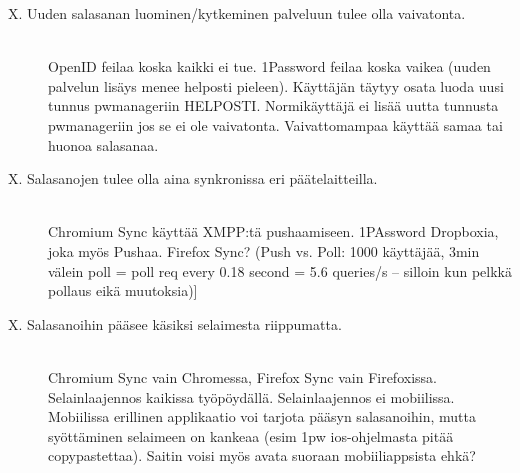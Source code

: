 \documentclass[english,gradu]{tktltiki}
\begin{document}
\begin{description}
           \item[X. Uuden salasanan luominen/kytkeminen palveluun tulee olla vaivatonta.] \hfill \\
               OpenID feilaa koska kaikki ei tue. 1Password feilaa koska vaikea (uuden palvelun lisäys menee helposti pieleen).
               Käyttäjän täytyy osata luoda uusi tunnus pwmanageriin HELPOSTI. Normikäyttäjä ei lisää uutta tunnusta pwmanageriin
               jos se ei ole vaivatonta. Vaivattomampaa käyttää samaa tai huonoa salasanaa.

           \item[X. Salasanojen tulee olla aina synkronissa eri päätelaitteilla.] \hfill \\
                Chromium Sync käyttää XMPP:tä pushaamiseen. 1PAssword Dropboxia, joka myös Pushaa. Firefox Sync? (Push vs. Poll:
                1000 käyttäjää, 3min välein poll = poll req every 0.18 second = 5.6 queries/s -- silloin kun pelkkä pollaus eikä
                muutoksia)]

           \item[X. Salasanoihin pääsee käsiksi selaimesta riippumatta.] \hfill \\
                Chromium Sync vain Chromessa, Firefox Sync vain Firefoxissa. Selainlaajennos kaikissa työpöydällä.
                Selainlaajennos ei mobiilissa. Mobiilissa erillinen applikaatio voi tarjota pääsyn salasanoihin, mutta syöttäminen selaimeen on kankeaa (esim 1pw ios-ohjelmasta pitää copypastettaa). Saitin voisi myös avata suoraan mobiiliappsista ehkä?

         \end{description}




\end{document}
